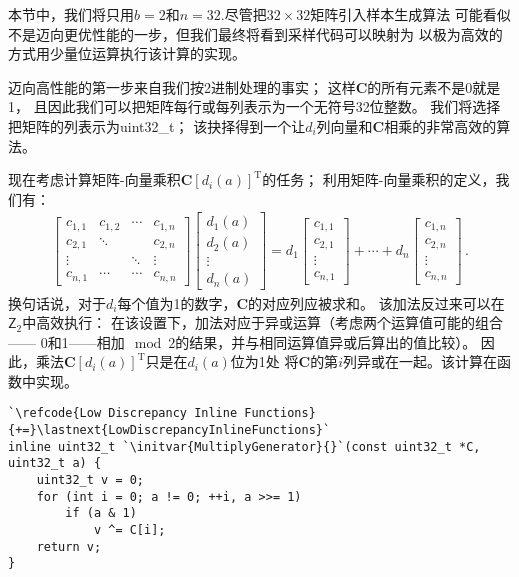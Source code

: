 本节中，我们将只用$b=2$和$n=32$.尽管把$32\times32$矩阵引入样本生成算法
可能看似不是迈向更优性能的一步，但我们最终将看到采样代码可以映射为
以极为高效的方式用少量位运算执行该计算的实现。

迈向高性能的第一步来自我们按2进制处理的事实；
这样$\bm C$的所有元素不是0就是1，
且因此我们可以把矩阵每行或每列表示为一个无符号32位整数。
我们将选择把矩阵的列表示为{\ttfamily uint32\_t}；
该抉择得到一个让$d_i$列向量和$\bm C$相乘的非常高效的算法。

现在考虑计算矩阵-向量乘积${\bm C}[d_i(a)]^{\mathrm{T}}$的任务；
利用矩阵-向量乘积的定义，我们有：
\begin{align}\label{eq:7.10}
    \left[
        \begin{array}{cccc}
            c_{1,1} & c_{1,2} & \cdots & c_{1,n} \\
            c_{2,1} & \ddots  &        & c_{2,n} \\
            \vdots  &         & \ddots & \vdots  \\
            c_{n,1} & \cdots  & \cdots & c_{n,n}
        \end{array}
        \right]\left[
        \begin{array}{c}
            d_1(a) \\
            d_2(a) \\
            \vdots \\
            d_n(a)
        \end{array}
        \right]
    =d_1\left[
        \begin{array}{c}
            c_{1,1} \\
            c_{2,1} \\
            \vdots  \\
            c_{n,1}
        \end{array}
        \right]+\cdots+d_n\left[
        \begin{array}{c}
            c_{1,n} \\
            c_{2,n} \\
            \vdots  \\
            c_{n,n}
        \end{array}
        \right]\, .
\end{align}
换句话说，对于$d_i$每个值为1的数字，$\bm C$的对应列应被求和。
该加法反过来可以在$\mathsf{Z}_2$中高效执行：
在该设置下，加法对应于异或运算（考虑两个运算值可能的组合——
0和1——相加$\mod{2}$的结果，并与相同运算值异或后算出的值比较）。
因此，乘法${\bm C}[d_i(a)]^{\mathrm{T}}$只是在$d_i(a)$位为1处
将$\bm C$的第$i$列异或在一起。该计算在函数中实现。
\begin{lstlisting}
`\refcode{Low Discrepancy Inline Functions}{+=}\lastnext{LowDiscrepancyInlineFunctions}`
inline uint32_t `\initvar{MultiplyGenerator}{}`(const uint32_t *C, uint32_t a) {
    uint32_t v = 0;
    for (int i = 0; a != 0; ++i, a >>= 1)
        if (a & 1)
            v ^= C[i];
    return v;
}
\end{lstlisting}

